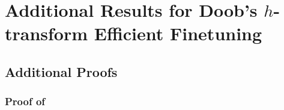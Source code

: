 
\chapter{Additional Results for Doob's \texorpdfstring{$h$}{h}-transform Efficient Finetuning}

\label{app:deft}

\section{Additional Proofs}

\subsection{Proof of }
\label{app:proof_noisy_cond}

